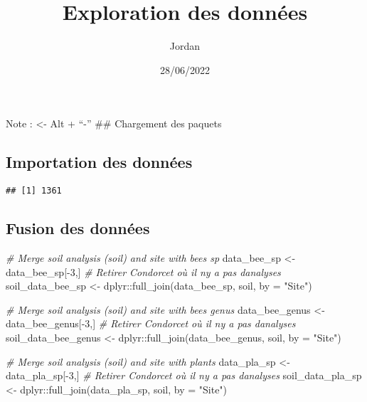 \documentclass[
]{article}
\title{Exploration des données}
\author{Jordan}
\date{28/06/2022}
\newenvironment{Shaded}{\begin{snugshade}}{\end{snugshade}}
\newcommand{\AttributeTok}[1]{\textcolor[rgb]{0.77,0.63,0.00}{#1}}
\newcommand{\CommentTok}[1]{\textcolor[rgb]{0.56,0.35,0.01}{\textit{#1}}}
\newcommand{\DecValTok}[1]{\textcolor[rgb]{0.00,0.00,0.81}{#1}}
\newcommand{\FunctionTok}[1]{\textcolor[rgb]{0.00,0.00,0.00}{#1}}
\newcommand{\NormalTok}[1]{#1}
\newcommand{\OtherTok}[1]{\textcolor[rgb]{0.56,0.35,0.01}{#1}}
\newcommand{\SpecialCharTok}[1]{\textcolor[rgb]{0.00,0.00,0.00}{#1}}
\newcommand{\StringTok}[1]{\textcolor[rgb]{0.31,0.60,0.02}{#1}}
\begin{document}
\maketitle

Note : \textless- Alt + ``-'' \#\# Chargement des paquets

\hypertarget{importation-des-donnuxe9es}{%
\subsection{Importation des données}\label{importation-des-donnuxe9es}}

\begin{Shaded}
\end{Shaded}

\begin{verbatim}
## [1] 1361
\end{verbatim}

\hypertarget{fusion-des-donnuxe9es}{%
\subsection{Fusion des données}\label{fusion-des-donnuxe9es}}

\begin{Shaded}
\begin{Highlighting}[]
\CommentTok{\# Merge soil analysis (soil) and site with bees sp}
\NormalTok{data\_bee\_sp }\OtherTok{\textless{}{-}}\NormalTok{ data\_bee\_sp[}\SpecialCharTok{{-}}\DecValTok{3}\NormalTok{,] }\CommentTok{\# Retirer Condorcet où il n\textquotesingle{}y a pas d\textquotesingle{}analyses}
\NormalTok{soil\_data\_bee\_sp }\OtherTok{\textless{}{-}}\NormalTok{ dplyr}\SpecialCharTok{::}\FunctionTok{full\_join}\NormalTok{(data\_bee\_sp, soil, }\AttributeTok{by =} \StringTok{"Site"}\NormalTok{)}

\CommentTok{\# Merge soil analysis (soil) and site with bees genus}
\NormalTok{data\_bee\_genus }\OtherTok{\textless{}{-}}\NormalTok{ data\_bee\_genus[}\SpecialCharTok{{-}}\DecValTok{3}\NormalTok{,] }\CommentTok{\# Retirer Condorcet où il n\textquotesingle{}y a pas d\textquotesingle{}analyses}
\NormalTok{soil\_data\_bee\_genus }\OtherTok{\textless{}{-}}\NormalTok{ dplyr}\SpecialCharTok{::}\FunctionTok{full\_join}\NormalTok{(data\_bee\_genus, soil, }\AttributeTok{by =} \StringTok{"Site"}\NormalTok{)}

\CommentTok{\# Merge soil analysis (soil) and site with plants}
\NormalTok{data\_pla\_sp }\OtherTok{\textless{}{-}}\NormalTok{ data\_pla\_sp[}\SpecialCharTok{{-}}\DecValTok{3}\NormalTok{,] }\CommentTok{\# Retirer Condorcet où il n\textquotesingle{}y a pas d\textquotesingle{}analyses}
\NormalTok{soil\_data\_pla\_sp }\OtherTok{\textless{}{-}}\NormalTok{ dplyr}\SpecialCharTok{::}\FunctionTok{full\_join}\NormalTok{(data\_pla\_sp, soil, }\AttributeTok{by =} \StringTok{"Site"}\NormalTok{)}
\end{Highlighting}
\end{Shaded}
\end{document}
